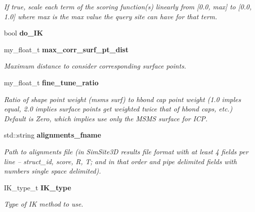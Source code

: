 \begin{CompactItemize}
\begin{CompactList}\small\item\em If true, scale each term of the scoring function(s) linearly from [0.0, max] to [0.0, 1.0] where max is the max value the query site can have for that term. \item\end{CompactList}\item 
bool \textbf{do\_\-IK}\label{classASCbase_1_1SearchParameters_ae98a5075be2f4c92734f47223076e6c}

\item 
my\_\-float\_\-t \bf{max\_\-corr\_\-surf\_\-pt\_\-dist}\label{classASCbase_1_1SearchParameters_ac2413e22df6100db6b73f5920cc9ddd}

\begin{CompactList}\small\item\em Maximum distance to consider corresponding surface points. \item\end{CompactList}\item 
my\_\-float\_\-t \bf{fine\_\-tune\_\-ratio}\label{classASCbase_1_1SearchParameters_62849cae5f51eb12263a341056af66c5}

\begin{CompactList}\small\item\em Ratio of shape point weight (msms surf) to hbond cap point weight (1.0 imples equal, 2.0 implies surface points get weighted twice that of hbond caps, etc.) Default is Zero, which implies use only the MSMS surface for ICP. \item\end{CompactList}\item 
std::string \bf{alignments\_\-fname}\label{classASCbase_1_1SearchParameters_5a36fe41006109a902194d9e2cf39e1a}

\begin{CompactList}\small\item\em Path to alignments file (in Sim\-Site3D results file format with at least 4 fields per line -- struct\_\-id, score, R, T; and in that order and pipe delimited fields with numbers single space delimited). \item\end{CompactList}\item 
IK\_\-type\_\-t \bf{IK\_\-type}\label{classASCbase_1_1SearchParameters_84a374fa89c1f6d5868a830091d2178c}

\begin{CompactList}\small\item\em Type of IK method to use. \item\end{CompactList}\end{CompactItemize}
